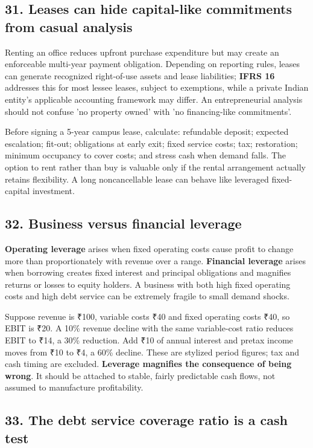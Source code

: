 \subsection{31. Leases can hide capital-like commitments from casual analysis}


Renting an office reduces upfront purchase expenditure but may create an enforceable multi-year payment obligation. Depending on reporting rules, leases can generate recognized right-of-use assets and lease liabilities; \textbf{IFRS 16} addresses this for most lessee leases, subject to exemptions, while a private Indian entity's applicable accounting framework may differ. An entrepreneurial analysis should not confuse 'no property owned' with 'no financing-like commitments'.

Before signing a 5-year campus lease, calculate: refundable deposit; expected escalation; fit-out; obligations at early exit; fixed service costs; tax; restoration; minimum occupancy to cover costs; and stress cash when demand falls. The option to rent rather than buy is valuable only if the rental arrangement actually retains flexibility. A long noncancellable lease can behave like leveraged fixed-capital investment.

\subsection{32. Business versus financial leverage}


\textbf{Operating leverage} arises when fixed operating costs cause profit to change more than proportionately with revenue over a range. \textbf{Financial leverage} arises when borrowing creates fixed interest and principal obligations and magnifies returns or losses to equity holders. A business with both high fixed operating costs and high debt service can be extremely fragile to small demand shocks.

Suppose revenue is ₹100, variable costs ₹40 and fixed operating costs ₹40, so EBIT is ₹20. A 10\% revenue decline with the same variable-cost ratio reduces EBIT to ₹14, a 30\% reduction. Add ₹10 of annual interest and pretax income moves from ₹10 to ₹4, a 60\% decline. These are stylized period figures; tax and cash timing are excluded. \textbf{Leverage magnifies the consequence of being wrong}. It should be attached to stable, fairly predictable cash flows, not assumed to manufacture profitability.

\subsection{33. The debt service coverage ratio is a cash test}


